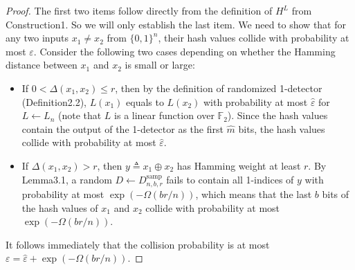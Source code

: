 \begin{proof}
The first two items follow directly from the definition of $H^L$ from Construction1. So we will only establish the last item. We need to show that for any two inputs $x_1\ne x_2$ from $\{0,1\}^n$, their hash values collide with probability at most $\varepsilon$.
Consider the following two cases depending on whether the Hamming distance between $x_1$ and $x_2$ is small or large:
\begin{itemize}
\item If $0<\Delta(x_1,x_2)\le r$, then by the definition of randomized 1-detector (Definition2.2), $L(x_1)$ equals to $L(x_2)$ with probability at most $\hat\varepsilon$ for $L\leftarrow L_n$ (note that $L$ is a linear function over $\mathbb F_2$). Since the hash values contain the output of the 1-detector as the first $\hat m$ bits, the hash values collide with probability at most $\hat\varepsilon$.
\item If $\Delta(x_1,x_2)>r$, then $y\triangleq x_1\oplus x_2$ has Hamming weight at least $r$. By Lemma3.1, a random $D\leftarrow D^{\mathrm{samp}}_{n,b,r}$ fails to contain all 1-indices of $y$ with probability at most $\exp(-\Omega(br/n))$, which means that the last $b$ bits of the hash values of $x_1$ and $x_2$ collide with probability at most $\exp(-\Omega(br/n))$.
\end{itemize}
It follows immediately that the collision probability is at most $\varepsilon=\hat\varepsilon+\exp(-\Omega(br/n))$.
\end{proof}

